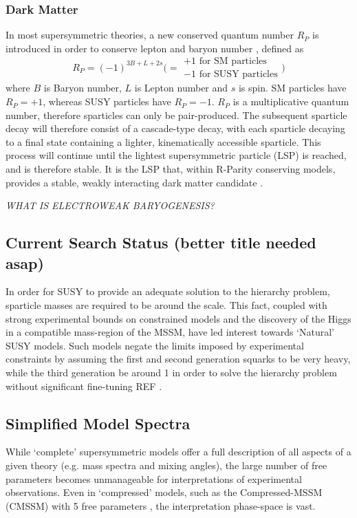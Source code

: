 \subsubsection{Dark Matter}
In most supersymmetric theories, a new conserved quantum number $R_P$
is introduced in order to conserve lepton and baryon number
\cite{Farrar1978575}, defined as
% 
\begin{equation}
R_P = (-1)^{3B+L+2s} \Bigg( =
\begin{array}{l} 
+1 \text{ for SM particles}\\ -1 \text{ for SUSY particles}
\end{array}\Bigg)
\end{equation}
% 
where $B$ is Baryon number, $L$ is Lepton number and $s$ is spin. SM particles
have $R_P = +1$, whereas SUSY particles have $R_P = -1$. $R_P$ is a
multiplicative quantum number, therefore sparticles
can only be pair-produced. The subsequent sparticle decay will therefore consist
of a cascade-type decay, with each sparticle decaying to a final state
containing a lighter, kinematically accessible sparticle. This process will
continue until the lightest supersymmetric particle (LSP) is reached, and is
therefore stable. It is the LSP that, within R-Parity conserving models,
provides a stable, weakly interacting dark matter candidate
\cite{Jungman:1995df}.

\emph{WHAT IS ELECTROWEAK BARYOGENESIS?}

\subsection{Current Search Status (better title needed asap)}
In order for SUSY to provide an adequate solution to the hierarchy problem,
sparticle masses are required to be around the \tev scale. This fact, coupled
with strong experimental bounds on constrained models and the discovery of
the Higgs in a compatible mass-region of the MSSM, have led interest
towards `Natural' SUSY models. Such models negate the limits imposed by
experimental constraints by assuming the first and second generation squarks to
be very heavy, while the third generation be around 1 \tev in order to solve
the hierarchy problem without significant fine-tuning REF \cite{Carena:2008rt}.

\subsection{Simplified Model Spectra}
While `complete' supersymmetric models offer a full description of all
aspects of a given theory (e.g. mass spectra and mixing angles), the large
number of free parameters becomes unmanageable for interpretations
of experimental observations. Even in `compressed' models, such as the
Compressed-MSSM (CMSSM) with 5
free parameters \cite{Kane:1993td}, the interpretation phase-space is vast.


